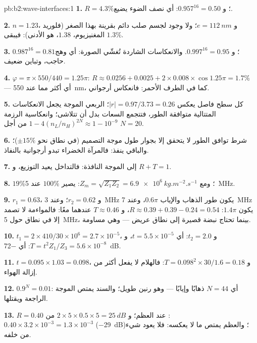 \begin{solution}{pb:b2:wave-interfaces:1}
\textbf{1.} $R = 4.3\%$؛ و $0.957^{16} = 0.50$: أي نصف الضوء يضيع.

\textbf{2.} $n = 1.23$، و $e = \qty{112}{nm}$؛ ولا وجود لجسم صلب دائم بقرينة
بهذا الصغر (فلوريد المغنيزيوم، $1.38$، هو الأدنى): فيبقى $1.3\%$.

\textbf{3.} $0.987^{16} = 0.81$؛ و $0.997^{16} = 0.95$. والانعكاسات الشاردة تُغشّي
الصورة: أي وهج حاجب، وتباين ضعيف.

\textbf{4.} $\varphi = \pi \times 550/440 = 1.25\pi$: $R \approx 0.0256 + 0.0025 + 2 \times 0.008 \times
\cos1.25\pi = 1.7\%$ --- أي أكثر مما عند \qty{550}{nm}، كما في الطرف
الأحمر: فانعكاس أرجواني.

\textbf{5.} كل سطح فاصل يعكس $|r| = 0.97/3.73 = 0.26$؛  الربعي
الموجة يجعل الانعكاسات المتتالية متوافقة الطور، فتتجمع السعات بدل
أن تتلاشى؛ وانعكاسية الرزمة $1 - 4(n_L/n_H)^{2N}
\approx 1 - 10^{-9}$ من أجل $N = 20$.

\textbf{6.} شرط توافق الطور لا يتحقق إلا بجوار طول موجة
التصميم (في نطاق نحو $\pm15\%$)؛ والباقي ينفذ: فالمرآة الخضراء تبدو
أرجوانية بالنفاذ.

\textbf{7.} إلى الموجة النافذة: فالتداخل يعيد التوزيع،
و $R + T = 1$.

\textbf{8.} $19\%$؛ ومع $Z_m = \sqrt{Z_1Z_2} = \qty{6.9e6}{kg.m^{-2}.s^{-1}}$: يصير $100\%$ عند
\qty{5}{MHz}.

\textbf{9.} $r_1 = 0.63$، و $r_2 = 0.62$؛ وعند \qty{3}{MHz} يكون طور الذهاب
والإياب $0.6\pi$، وعند \qty{7}{MHz} يكون $1.4\pi$: $R \approx 0.39 + 0.39 - 0.24 = 0.54$، و $T \approx 0.46$
عندهما معًا: فالمواءمة لا تصمد إلا في نطاق حول \qty{5}{MHz}، بينما
تحتاج نبضة قصيرة إلى نطاق عريض --- وهي مساومة.

\textbf{10.} $t_1 = 2 \times 410/30 \times 10^6 = 2.7 \times 10^{-5}$، و $t_2 = 2.0$: أي $t = 5.5 \times 10^{-5}$،
و $T = t^2Z_1/Z_3 = 5.6 \times 10^{-8}$: أي \qty{-72}{dB}.

\textbf{11.} $t = 0.095 \times 1.03 = 0.098$، و $T = 0.098^2 \times 30/1.6 = 0.18$: فالهلام
لا يفعل أكثر من إزالة الهواء.

\textbf{12.} $0.9^N = 0.01$: أي $N = 44$ ذهابًا وإيابًا --- وهو رنين طويل؛
والسند يمتص الموجة الراجعة ويقتلها.

\textbf{13.} $R = 0.40$ عند العظم؛ و $2 \times 5 \times 0.5 \times 5 = \qty{25}{dB}$ من
: $0.40 \times 3.2 \times 10^{-3} = 1.3 \times 10^{-3}$ (\qty{-29}{dB})؛ والعظم يمتص ما
لا يعكسه: فلا يعود شيء من خلفه.


\end{solution}
